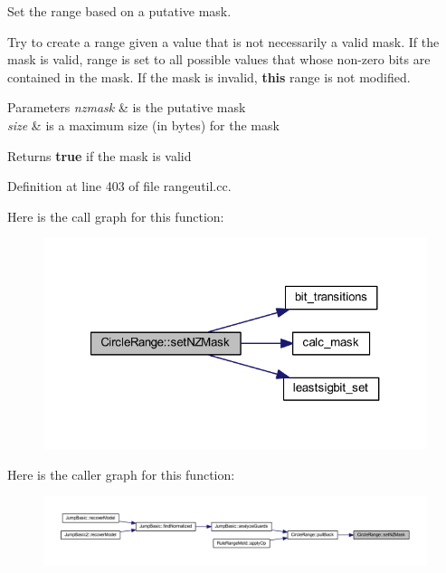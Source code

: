 Set the range based on a putative mask. 

Try to create a range given a value that is not necessarily a valid mask. If the mask is valid, range is set to all possible values that whose non-\/zero bits are contained in the mask. If the mask is invalid, {\bfseries{this}} range is not modified. 
\begin{DoxyParams}{Parameters}
{\em nzmask} & is the putative mask \\
\hline
{\em size} & is a maximum size (in bytes) for the mask \\
\hline
\end{DoxyParams}
\begin{DoxyReturn}{Returns}
{\bfseries{true}} if the mask is valid 
\end{DoxyReturn}


Definition at line 403 of file rangeutil.\+cc.

Here is the call graph for this function\+:
\nopagebreak
\begin{figure}[H]
\begin{center}
\leavevmode
\includegraphics[width=321pt]{class_circle_range_a82f38601c64d4bdcc4aa977c2896b0f4_cgraph}
\end{center}
\end{figure}
Here is the caller graph for this function\+:
\nopagebreak
\begin{figure}[H]
\begin{center}
\leavevmode
\includegraphics[width=350pt]{class_circle_range_a82f38601c64d4bdcc4aa977c2896b0f4_icgraph}
\end{center}
\end{figure}
\mbox{\label{class_circle_range_a44fa8dca988417e0381e891268713a03}} 
